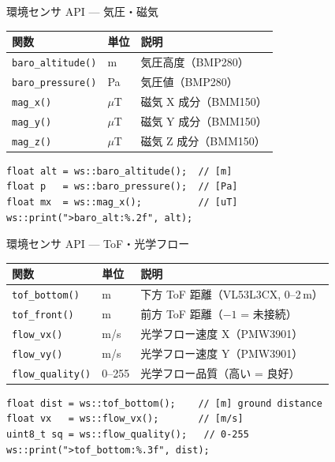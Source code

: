 \begin{frame}[fragile]{環境センサ API --- 気圧・磁気}
  \vspace{0.3em}
  {\small
  \begin{tabular}{lll}
    \hline
    \textbf{関数} & \textbf{単位} & \textbf{説明} \\
    \hline
    \texttt{baro\_altitude()} & m   & 気圧高度（BMP280） \\
    \texttt{baro\_pressure()} & Pa  & 気圧値（BMP280） \\
    \texttt{mag\_x()}         & $\mu$T & 磁気 X 成分（BMM150） \\
    \texttt{mag\_y()}         & $\mu$T & 磁気 Y 成分（BMM150） \\
    \texttt{mag\_z()}         & $\mu$T & 磁気 Z 成分（BMM150） \\
    \hline
  \end{tabular}
  }

  \vspace{0.3em}

  \begin{lstlisting}[style=sfcpp, basicstyle=\ttfamily\scriptsize]
float alt = ws::baro_altitude();  // [m]
float p   = ws::baro_pressure();  // [Pa]
float mx  = ws::mag_x();          // [uT]
ws::print(">baro_alt:%.2f", alt);
  \end{lstlisting}
\end{frame}

\begin{frame}[fragile]{環境センサ API --- ToF・光学フロー}
  \vspace{0.3em}
  {\small
  \begin{tabular}{lll}
    \hline
    \textbf{関数} & \textbf{単位} & \textbf{説明} \\
    \hline
    \texttt{tof\_bottom()}   & m     & 下方 ToF 距離（VL53L3CX, 0--2\,m） \\
    \texttt{tof\_front()}    & m     & 前方 ToF 距離（$-1$ = 未接続） \\
    \texttt{flow\_vx()}      & m/s   & 光学フロー速度 X（PMW3901） \\
    \texttt{flow\_vy()}      & m/s   & 光学フロー速度 Y（PMW3901） \\
    \texttt{flow\_quality()} & 0--255 & 光学フロー品質（高い = 良好） \\
    \hline
  \end{tabular}
  }

  \vspace{0.3em}

  \begin{lstlisting}[style=sfcpp, basicstyle=\ttfamily\scriptsize]
float dist = ws::tof_bottom();    // [m] ground distance
float vx   = ws::flow_vx();       // [m/s]
uint8_t sq = ws::flow_quality();   // 0-255
ws::print(">tof_bottom:%.3f", dist);
  \end{lstlisting}
\end{frame}

